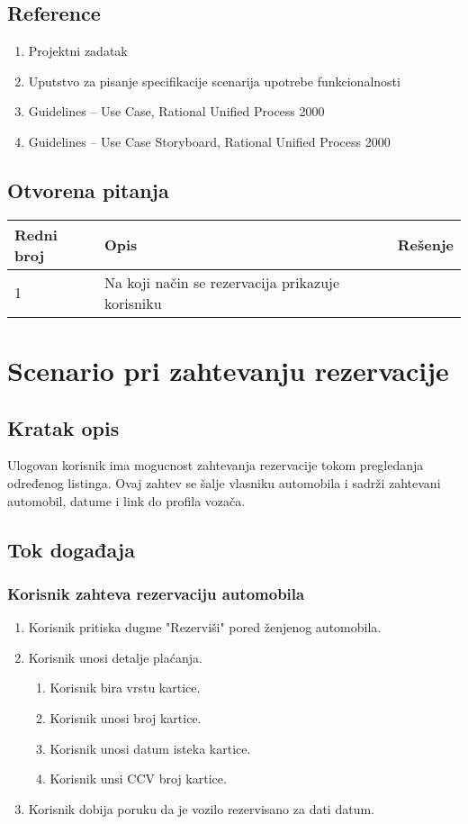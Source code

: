 \documentclass[12pt]{article}
\begin{document}
\subsection{Reference}
\begin{enumerate}
   \item Projektni zadatak
   \item Uputstvo za pisanje specifikacije scenarija upotrebe funkcionalnosti
   \item  Guidelines – Use Case, Rational Unified Process 2000
   \item  Guidelines – Use Case Storyboard, Rational Unified Process 2000
 \end{enumerate}
\subsection{Otvorena pitanja}


\begin{center}
\begin{tabular}{ | m{2cm} | m{7cm}| m{7cm} | } 
\hline
Redni broj& Opis & Rešenje \\ 
\hline
1 & Na koji način se rezervacija prikazuje korisniku & \\ 
\hline
\end{tabular}
\end{center}

    

\section{Scenario pri zahtevanju rezervacije}
\subsection{Kratak opis}
Ulogovan korisnik ima mogucnost zahtevanja rezervacije tokom pregledanja određenog
listinga. Ovaj zahtev se šalje vlasniku automobila i sadrži zahtevani automobil, datume i link do profila vozača.
\subsection{Tok događaja}

\subsubsection{Korisnik zahteva rezervaciju automobila}
\begin{enumerate}
  \item Korisnik pritiska dugme "Rezerviši" pored ženjenog automobila.
  \item Korisnik unosi detalje plaćanja.
  \begin{enumerate}
    \item Korisnik bira vrstu kartice.
    \item Korisnik unosi broj kartice.
    \item Korisnik unosi datum isteka kartice.
    \item Korisnik unsi CCV broj kartice.
\end{enumerate}
  \item Korisnik dobija poruku da je vozilo rezervisano za dati datum.
  
\end{enumerate}
\end{document}
